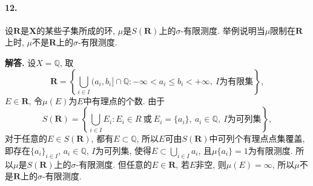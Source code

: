 \documentclass[12pt, a4paper, oneside]{ctexart}
\newenvironment{solution}{\par\noindent\textbf{解答. }}{\bigskip\par}
\let\leq=\leqslant %
\def\bd{\boldsymbol}    %
\def\Q{\mathbb{Q}}      %
\begin{document}
\paragraph{12.}设$\bd{R}$是$\bd{X}$的某些子集所成的环, $\mu$是$S(\bd{R})$上的$\sigma$-有限测度. 举例说明当$\mu$限制在$\bd{R}$上时, $\mu$不是$\bd{R}$上的$\sigma$-有限测度.
\begin{solution}
    设$X = \Q$, 取
    \begin{equation*}
        \bd{R} = \left\{\bigcup_{i\in I}(a_i, b_i]\cap\Q:-\infty < a_i\leq b_i < +\infty,\ I\text{为有限集}\right\},
    \end{equation*}
    $E\in \bd{R}$, 令$\mu(E)$为$E$中有理点的个数. 由于
    \begin{equation*}
        S(\bd{R}) = \left\{\bigcup_{i\in I}E_i:E_i\in R\ \text{或}\ E_i = \{a_i\},\ a_i\in \Q,\ I\text{为可列集}\right\},
    \end{equation*}
    对于任意的$E\in S(\bd{R})$, 都有$E\subset \Q$, 所以$E$可由$S(\bd{R})$中可列个有理点点集覆盖, 即存在$\{a_i\}_{i\in I}$, $a_i\in \Q$, $I$为可列集, 使得$E\subset\bigcup_{i\in I}a_i$, 且$\mu\{a_i\} = 1$为有限测度. 所以$\mu$是$S(\bd{R})$上的$\sigma$-有限测度. 但任意的$E\in \bd{R}$, 若$E$非空, 则$\mu(E) = \infty$, 所以$\mu$不是$\bd{R}$上的$\sigma$-有限测度.
\end{solution}

\iffalse
\centerline{
    \texttt{[image: figure.png]}
}
\renewcommand\arraystretch{0.8} %
\begin{table}[!htbp] %
    \centering %
    \begin{tabular}{p{1cm}<{\centering}p{1cm}<{\centering}p{3cm}<{\centering}p{5cm}<{\centering}} %
        \toprule
        $x_i$ & $f[x_1]$ & $f[x_i,x_{i+1}]$ & $f[x_i,x_{i+1},x_{i+2}]$ \\
        \midrule
        $x_0$ & $f(x_0)$ &                  &                          \\
        $x_0$ & $f(x_0)$ & $f'(x_0)$        &                          \\
        $x_0$ & $f(x_1)$ & $\frac{f(x_1)-f(x_0)}{x_1-x_0}$ & $\frac{f(x_1)-f(x_0)}{(x_1-x_0)^2}-\frac{f'(x_0)}{x_1-x_0}$\\
        \bottomrule
    \end{tabular}
\end{table}

\def\Log{\text{Log}} %
$\Log$ %
\fi
\end{document}
